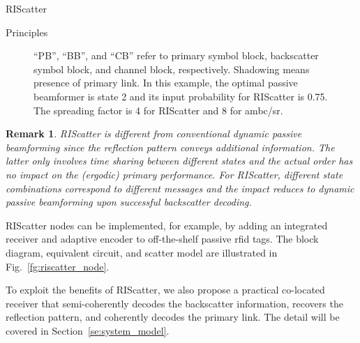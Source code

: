\documentclass[journal]{IEEEtran}
\newtheorem{remark}{Remark}
\begin{document}
\begin{section}{RIScatter}
\begin{subsection}{Principles}
\begin{figure}[!t]
{				``PB'', ``BB'', and ``CB'' refer to primary symbol block, backscatter symbol block, and channel block, respectively.
				Shadowing means presence of primary link.
				In this example, the optimal passive beamformer is state \num{2} and its input probability for RIScatter is \num{0.75}.
				The spreading factor is \num{4} for RIScatter and \num{8} for \gls{ambc}/\gls{sr}.
			}
			\label{fg:scatter_comparison}
		\end{figure}
		\begin{remark}
			RIScatter is different from conventional dynamic passive beamforming since the reflection pattern conveys additional information.
			The latter only involves time sharing between different states and the actual order has no impact on the (ergodic) primary performance.
			For RIScatter, different state combinations correspond to different messages and the impact reduces to dynamic passive beamforming upon successful backscatter decoding.
		\end{remark}

		RIScatter nodes can be implemented, for example, by adding an integrated receiver \cite{Kim2021a} and adaptive encoder \cite{He2020e} to off-the-shelf passive \gls{rfid} tags.
		The block diagram, equivalent circuit, and scatter model are illustrated in Fig.~\ref{fg:riscatter_node}.
		\begin{figure*}[!t]
			\centering
			\caption{
			Block diagram, equivalent circuit, and scatter model of a RIScatter node.
			The solid and dashed vectors represent signal and energy flows.
			The scatter antenna behaves as a constant power source, where the voltage $V_0$ and current $I_0$ are introduced by incident electric field $\vec{E}_{\text{I}}$ and magnetic field $\vec{H}_{\text{I}}$ \cite{Huang2021}.
			}
			\label{fg:riscatter_node}
		\end{figure*}
		To exploit the benefits of RIScatter, we also propose a practical co-located receiver that semi-coherently decodes the backscatter information, recovers the reflection pattern, and coherently decodes the primary link.
		The detail will be covered in Section~\ref{se:system_model}.
	\end{subsection}


\end{section}
\end{document}

